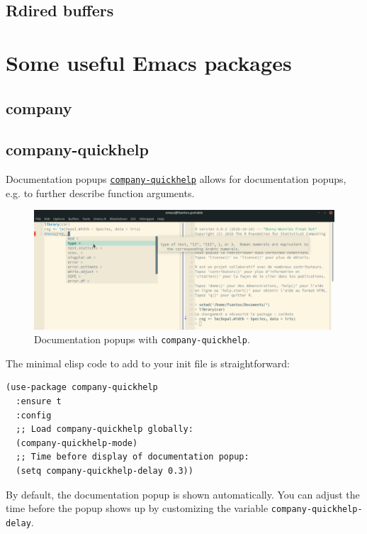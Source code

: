 \documentclass[presentation]{beamer}
\begin{document}
\subsection{Rdired buffers}
\label{sec:org1a1518a}

\section{Some useful Emacs packages}
\label{sec:org20d0135}
\subsection{company}
\label{sec:org0627fc2}
\subsection{company-quickhelp}
\label{sec:org5ef0abf}
\begin{frame}[fragile,allowframebreaks,label=]{Documentation popups}
 \href{https://github.com/company-mode/company-quickhelp}{\texttt{company-quickhelp}} allows for documentation popups, e.g. to further describe function arguments.

\begin{figure}[htbp]
\centering
\includegraphics[width=\textwidth]{./images/company-quickhelp.png}
\caption{Documentation popups with \texttt{company-quickhelp}.}
\end{figure}

The minimal elisp code to add to your init file is straightforward:

\begin{verbatim}
(use-package company-quickhelp
  :ensure t
  :config
  ;; Load company-quickhelp globally:
  (company-quickhelp-mode)
  ;; Time before display of documentation popup:
  (setq company-quickhelp-delay 0.3))
\end{verbatim}

By default, the documentation popup is shown automatically. You can adjust the time before the popup shows up by customizing the variable \texttt{company-quickhelp-delay}.
\end{frame}
\end{document}
